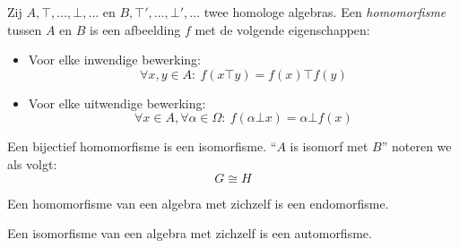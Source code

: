 \documentclass[main.tex]{subfiles}
\begin{document}
\begin{de}
  \label{de:morfisme}
  Zij $A,\top,\dotsc,\bot,\dotsc$ en $B,\top',\dotsc,\bot',\dotsc$ twee homologe algebras.
  Een \emph{homomorfisme} tussen $A$ en $B$ is een afbeelding $f$ met de volgende eigenschappen:
  \begin{itemize}
  \item Voor elke inwendige bewerking:
    \[ \forall x,y \in A:\ f(x\top y) = f(x) \top f(y) \]  
  \item Voor elke uitwendige bewerking:
    \[ \forall x \in A,\forall \alpha\in\Omega:\ f(\alpha\bot x) = \alpha\bot f(x) \]  
  \end{itemize}
\end{de}

\begin{de}
  Een bijectief homomorfisme is een isomorfisme.
  ``$A$ is isomorf met $B$'' noteren we als volgt:
  \[ G \cong H \]
\end{de}

\begin{de}
  Een homomorfisme van een algebra met zichzelf is een endomorfisme.
\end{de}

\begin{de}
  Een isomorfisme van een algebra met zichzelf is een automorfisme.
\end{de}
\end{document}
